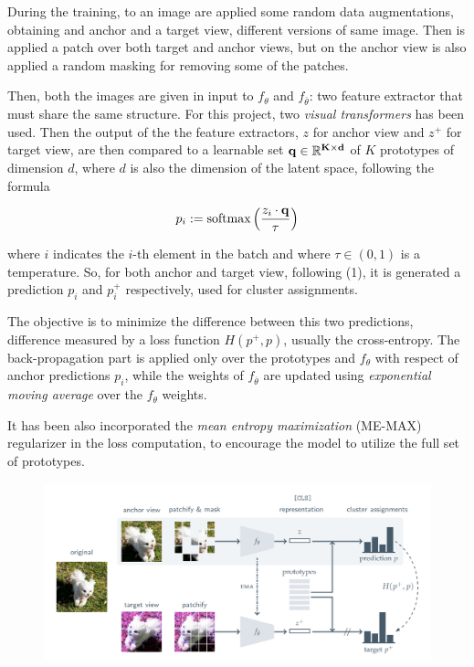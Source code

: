 \documentclass[column]{article}
\begin{document}
\begin{multicols}{2}
	During the training, to an image are applied some random data augmentations, obtaining and anchor and a target view, different versions of same image. Then is applied a patch over both target and anchor views, but on the anchor view is also applied a random masking for removing some of the patches. 
	
	Then, both the images are given in input to $f_\theta$ and $f_{\overline{\theta}}$: two feature extractor that must share the same structure. For this project, two \textit{visual transformers} has been used. Then the output of the the feature extractors, $z$ for anchor view and $z^+$ for target view, are then compared to a learnable set $\bf q \in \mathbb{R}^{K \times d}$ of $K$ prototypes of dimension $d$, where $d$ is also the dimension of the latent space, following the formula
	
	\begin{equation}
		p_{i} := \textnormal{softmax}\left(\frac{z_i \cdot \bf q}{\tau}\right)
	\end{equation}
	
	where $i$ indicates the $i$-th element in the batch and where $\tau\in(0,1)$ is a temperature. So, for both anchor and target view, following (1), it is generated a prediction $p_i$ and $p_i^+$ respectively, used for cluster assignments.
	
	The objective is to minimize the difference between this two predictions, difference measured by a loss function $H(p^+, p)$, usually the cross-entropy. The back-propagation part is applied only over the prototypes and $f_\theta$ with respect of anchor predictions $p_i$, while the weights of $f_{\overline{\theta}}$ are updated using \textit{exponential moving average} over the $f_\theta$ weights. 
	
	It has been also incorporated the \textit{mean entropy maximization} (ME-MAX) regularizer in the loss computation,  to encourage the model to utilize the full set of prototypes.
	
	\end{multicols}
	
	
	\begin{figure}[h]
		\centering
		\includegraphics[width=\textwidth]{Images/screenshot001}
		\caption[MSN workflow]{}
		\label{fig:screenshot001}
	\end{figure}
	
\end{document}
